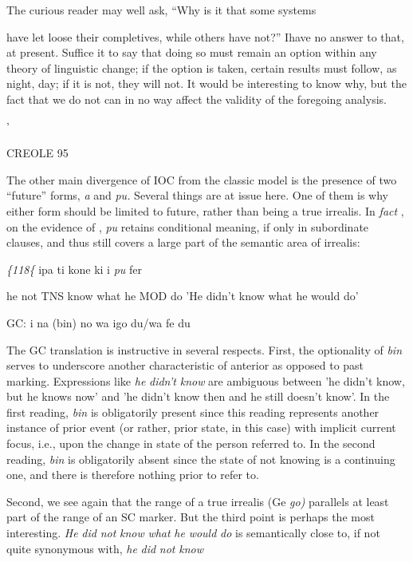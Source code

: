 The curious reader may well ask, ``Why is it that some systems

have let loose their completives, while others have not?'' Ihave no answer to that, at present. Suffice it to say that doing so must remain an option within any theory of linguistic change; if the option is taken, certain results must follow, as night, day; if it is not, they will not. It would be interesting to know why, but the fact that we do not can in no way affect the validity of the foregoing analysis.

'

CREOLE 95

The other main divergence of IOC from the classic model is the presence of two ``future'' forms, \textit{a} and \textit{pu.} Several things are at issue here. One of them is why either form should be limited to future, rather than being a true irrealis. In \textit{fact} , on the evidence of \citet[103]{Corne1977}, \textit{pu} retains conditional meaning, if only in subordinate clauses, and thus still covers a large part of the semantic area of ir\-realis:

\textit{\{118\{} ipa ti kone ki i \textit{pu} fer

he not TNS know what he MOD do 'He didn't know what he would do'

\ea\label{ex:119}
 GC: i na (bin) no wa igo du/wa fe du
\glt
\z

The GC translation is instructive in several respects. First, the optionality of \textit{bin} serves to underscore another characteristic of ante\-rior as opposed to past marking. Expressions like \textit{he} \textit{didn't} \textit{know} are ambiguous between 'he didn't know, but he knows now' and 'he didn't know then and he still doesn't know'. In the first reading, \textit{bin} is obli\-gatorily present since this reading represents another instance of prior event (or rather, prior state, in this case) with implicit current focus, i.e., upon the change in state of the person referred to. In the second reading, \textit{bin} is obligatorily absent since the state of not knowing is a continuing one, and there is therefore nothing prior to refer to.

Second, we see again that the range of a true irrealis (Ge \textit{go}\textit{)} parallels at least part of the range of an SC marker. But the third point is perhaps the most interesting. \textit{He }\textit{did} \textit{not} \textit{know} \textit{what} \textit{he} \textit{would} \textit{do }is semantically close to, if not quite synonymous with, \textit{he} \textit{did} \textit{not} \textit{know}

